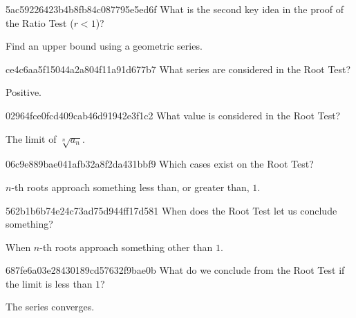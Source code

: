 \begin{note}{5ac59226423b4b8fb84c087795e5ed6f}
    What is the second key idea in the proof of the Ratio Test (\({ r < 1 }\))?

    \begin{cloze}{1}
        Find an upper bound using a geometric series.
    \end{cloze}
\end{note}

\begin{note}{ce4c6aa5f15044a2a804f11a91d677b7}
    What series are considered in the Root Test?

    \begin{cloze}{1}
        Positive.
    \end{cloze}
\end{note}

\begin{note}{02964fce0fcd409cab46d91942e3f1c2}
    What value is considered in the Root Test?

    \begin{cloze}{1}
        The limit of \({ \sqrt[n]{a_n} }\).
    \end{cloze}
\end{note}

\begin{note}{06c9e889bae041afb32a8f2da431bbf9}
    Which cases exist on the Root Test?

    \begin{cloze}{1}
        \({ n }\)-th roots approach something less than, or greater than, \({ 1 }\).
    \end{cloze}
\end{note}

\begin{note}{562b1b6b74e24c73ad75d944ff17d581}
    When does the Root Test let us conclude something?

    \begin{cloze}{1}
        When \({ n }\)-th roots approach something other than \({ 1 }\).
    \end{cloze}
\end{note}

\begin{note}{687fe6a03e28430189cd57632f9bae0b}
    What do we conclude from the Root Test if the limit is less than \({ 1 }\)?

    \begin{cloze}{1}
        The series converges.
    \end{cloze}
\end{note}

